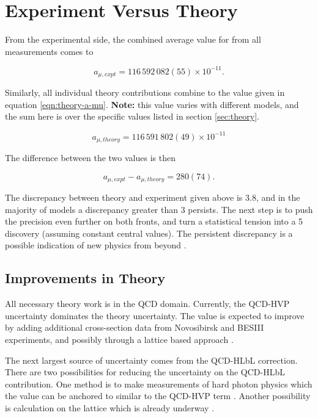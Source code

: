 \section{Experiment Versus Theory} \label{sec:tension}

From the experimental side, the combined average value for from all measurements comes to 

\begin{equation}
\label{eqn:expt-a-mu}
a_{\mu,expt} = 116\,592\,082 (55) \times 10^{-11}.
\end{equation}

\noindent
Similarly, all individual theory contributions combine to the value given in equation \ref{eqn:theory-a-mu}.  \textbf{Note:} this value varies with different models, and the sum here is over the specific values listed in section \ref{sec:theory}.

\begin{equation}
\label{eqn:theory-a-mu}
a_{\mu,theory} = 116\,591\,802 (49) \times 10^{-11}
\end{equation}

\noindent
The difference between the two values is then

\begin{equation}
\label{eqn:diff-a-mu}
a_{\mu,expt} - a_{\mu,theory} = 280 (74).
\end{equation}

The discrepancy between theory and experiment given above is \SI{3.8}{\sigma}, and in the majority of models a discrepancy greater than \SI{3}{\sigma} persists.  The next step is to push the precision even further on both fronts, and turn a statistical tension into a \SI{5}{\sigma} discovery (assuming constant central values).  The persistent discrepancy is a possible indication of new physics from beyond \tsm.

\subsection{Improvements in Theory}

All necessary theory work is in the QCD domain.  Currently, the QCD-HVP uncertainty dominates the theory uncertainty.  The value is expected to improve by adding additional cross-section data from Novosibirsk and BESIII experiments, and possibly through a lattice based approach \cite{muon-g-2-blum}.  

The next largest source of uncertainty comes from the QCD-HLbL correction.  There are two possibilities for reducing the uncertainty on the QCD-HLbL contribution.  One method is to make measurements of hard photon physics which the value can be anchored to similar to the QCD-HVP term \cite{muon-g-2-blum}.  Another possibility is calculation on the lattice which is already underway \cite{qcd-hlbl-blum-2016, qcd-hlbl-blum-2017}.  

